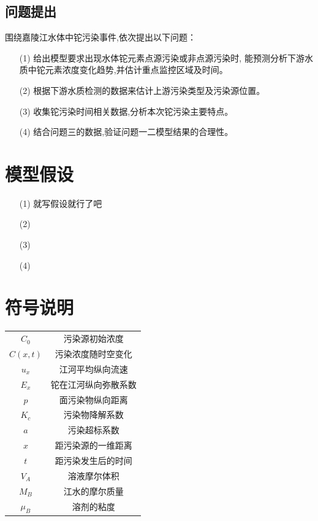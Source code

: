 \documentclass{whutmod}
\begin{document}
	\subsection{问题提出}
	
	围绕嘉陵江水体中铊污染事件,依次提出以下问题：
	
	\begin{itemize}
		\item [(1)]
		 给出模型要求出现水体铊元素点源污染或非点源污染时, 能预测分析下游水质中铊元素浓度变化趋势,并估计重点监控区域及时间。
		\item [(2)] 
		根据下游水质检测的数据来估计上游污染类型及污染源位置。
		\item [(3)] 收集铊污染时间相关数据,分析本次铊污染主要特点。
		\item [(4)] 结合问题三的数据,验证问题一二模型结果的合理性。
	\end{itemize}
	
	\section{模型假设}
	\begin{itemize}
		\item [(1)] 就写假设就行了吧
		\item [(2)] 
		\item [(3)]
		\item [(4)]
	\end{itemize}
	
	
	\section{符号说明}
	\begin{center}
		\begin{tabular}{cc}
			\hline
			\makebox[0.3\textwidth][c]{符号}	&  \makebox[0.4\textwidth][c]{意义} \\ \hline
			$C_{0}$	    &  污染源初始浓度 \\ \hline
			$C(x,t)$	    &  污染浓度随时空变化 \\ \hline
			$u_{x}$	    &  江河平均纵向流速 \\ \hline
			$E_{x}$  &  铊在江河纵向弥散系数\\ \hline
		$p$   &  面污染物纵向距离\\ \hline
			$K_{c}$	    & 污染物降解系数  \\ \hline
		    $a$	& 污染超标系数 \\ \hline
		     $x$	& 距污染源的一维距离 \\ \hline
		      $t$	& 距污染发生后的时间 \\ \hline
		       $V_{A}$	& 溶液摩尔体积 \\ \hline
		      $M_{B}$	& 江水的摩尔质量 \\ \hline
		     $\mu_{B}$	& 溶剂的粘度 \\ \hline		      
		\end{tabular}
	\end{center}
\end{document}
